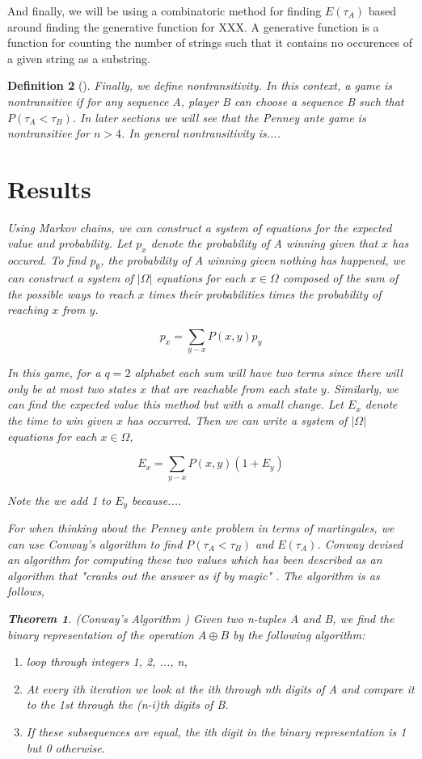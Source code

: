 \documentclass{article}
\newtheorem{theorem}{Theorem}[section]
\newtheorem{definition}[theorem]{Definition}
\numberwithin{mytheorem}{subsection} %
\begin{document}
		And finally, we will be using a combinatoric method for finding $E(\tau_A)$ based around finding the generative function for XXX. A generative function is a function for counting the number of strings such that it contains no occurences of a given string as a substring. 
		\begin{definition}[\cite{}]

		Finally, we define nontransitivity. In this context, a game is nontransitive if for any sequence A, player B can choose a sequence B such that $P(\tau_A < \tau_B)$. In later sections we will see that the Penney ante game is nontransitive for $n > 4$. In general nontransitivity is....

	\section{Results}
		Using Markov chains, we can construct a system of equations for the expected value and probability. Let $p_{x}$ denote the probability of A winning given that $x$ has occured. To find $p_\emptyset$, the probability of A winning given nothing has happened, we can construct a system of $|\Omega|$ equations for each $x \in \Omega$ composed of the sum of the possible ways to reach $x$ times their probabilities times the probability of reaching $x$ from $y$.

		$$p_x = \sum_{y - x} P(x,y) p_y$$

		In this game, for a $q=2$ alphabet each sum will have two terms since there will only be at most two states $x$ that are reachable from each state $y$. Similarly, we can find the expected value this method but with a small change. Let $E_x$ denote the time to win given $x$ has occurred. Then we can write a system of $|\Omega|$ equations for each $x \in \Omega$,

		$$E_x = \sum_{y - x} P(x,y) (1 + E_y)$$

		Note the we add 1 to $E_y$ because.... 

		For when thinking about the Penney ante problem in terms of martingales, we can use Conway's algorithm to find $P(\tau_A < \tau_B)$ and $E(\tau_A)$. Conway devised an algorithm for computing these two values which has been described as an algorithm that "cranks out the answer as if by magic" \cite{gardner}. The algorithm is as follows,

		\begin{theorem}(Conway's Algorithm \cite{gardner})
		Given two n-tuples A and B, we find the binary representation of
		the operation $A \oplus B$ by the following algorithm:
		\begin{enumerate}
		\item loop through integers 1, 2, ..., n,
		\item At every ith iteration we look at the ith through nth digits of A and compare
		   it to the 1st through the (n-i)th digits of B.
		\item If these subsequences are equal, the ith digit in the binary representation is 1 but 0 otherwise.
		\end{enumerate} 


\end{theorem}
\end{definition}
\end{document}

